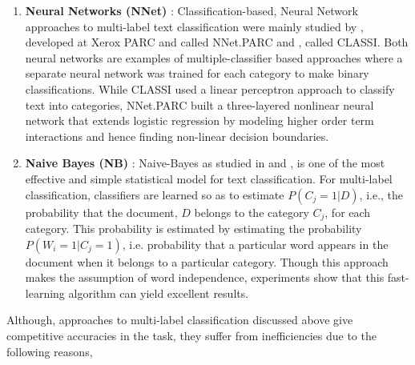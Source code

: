 \begin{enumerate}
\item{\textbf{Neural Networks (NNet)} : }Classification-based, Neural Network approaches to multi-label text classification were mainly studied by \cite{wiener1995neural}, developed at Xerox PARC and called NNet.PARC and \cite{ng1997feature}, called CLASSI. Both neural networks are examples of multiple-classifier based approaches where a separate neural network was trained for each category to make binary classifications. While CLASSI used a linear perceptron approach to classify text into categories, NNet.PARC built a three-layered nonlinear neural network that extends logistic regression by modeling higher order term interactions and hence finding non-linear decision boundaries. 

\item{\textbf{Naive Bayes (NB)} : }Naive-Bayes as studied in \cite{lewis1992representation} and \cite{lewis1994comparison}, is one of the most effective and simple statistical model for text classification. For multi-label classification, classifiers are learned so as to estimate $P(C_{j}=1|D)$, i.e., the probability that the document, $D$ belongs to the category $C_{j}$, for each category. This probability is estimated by estimating the probability $P(W_{i}=1|C_{j}=1)$, i.e. probability that a particular word appears in the document when it belongs to a particular category. Though this approach makes the assumption of word independence, experiments show that this fast-learning algorithm can yield excellent results. 
\end{enumerate}
Although, approaches to multi-label classification discussed above give competitive accuracies in the task, they suffer from inefficiencies due to the following reasons,
